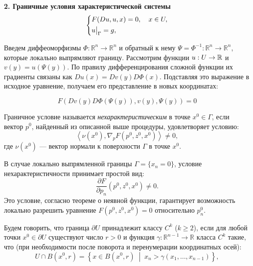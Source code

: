 \textbf{2. Граничные условия характеристической системы}\\
\begin{equation} \label{eq::2}
\left\{\begin{aligned}
    &F(Du, u, x) = 0, \quad x \in U, \\
    &u\big|_{\Gamma} = g,
\end{aligned}\right.
\end{equation}

Введем диффеоморфизмы $\Phi \colon \mathbb{R}^n \to \mathbb{R}^n$ и обратный к 
нему $\Psi = \Phi^{-1} \colon \mathbb{R}^n \to \mathbb{R}^n$, которые локально 
выпрямляют границу. Рассмотрим функции $u: U\to\mathbb{R}$ и $v(y) = u(\Psi(y))$.
По правилу дифференцирования сложной функции их градиенты связаны как $Du(x) = Dv(y) D\Phi(x)$.
Подставляя это выражение в исходное уравнение, получаем его представление в новых координатах:


$$F(Dv(y)D\Phi(\Psi(y)), v(y), \Psi(y)) = 0$$

\begin{definition}
  Граничное условие называется \textit{нехарактеристическим} в точке 
  $x^0 \in \Gamma$, если вектор $p^0$, найденный из описанной выше 
  процедуры, удовлетворяет условию:
  \begin{equation}
      \left\langle \nu(x^0), \nabla_p F(p^0, z^0, x^0) \right\rangle \neq 0,
  \end{equation}
  где $\nu(x^0)$ --- вектор нормали к поверхности $\Gamma$ в точке $x^0$.
\end{definition}

В случае локально выпрямленной границы $\Gamma = \{x_n = 0\}$, условие 
нехарактеристичности принимает простой вид:
\begin{equation}
    \frac{\partial F}{\partial p_n}(p^0, z^0, x^0) \neq 0.
\end{equation}
Это условие, согласно теореме о неявной функции, гарантирует возможность 
локально разрешить уравнение $F(p^0, z^0, x^0) = 0$ относительно $p_n^0$.




\begin{definition}
Будем говорить, что граница $\partial U$ принадлежит классу $C^k$ ($k \ge 2$),
если для любой точки $x^0 \in \partial U$ существуют число $r > 0$ и функция 
$\gamma \colon \mathbb{R}^{n-1} \to \mathbb{R}$ класса $C^k$ такие, что 
  (при необходимости после поворота и перенумерации координатных осей):
\begin{equation}
    U \cap B(x^0, r) = \left\{ x \in B(x^0, r) \;\middle|\; x_n > \gamma(x_1, \dots, x_{n-1}) \right\},
\end{equation}
\end{definition}

